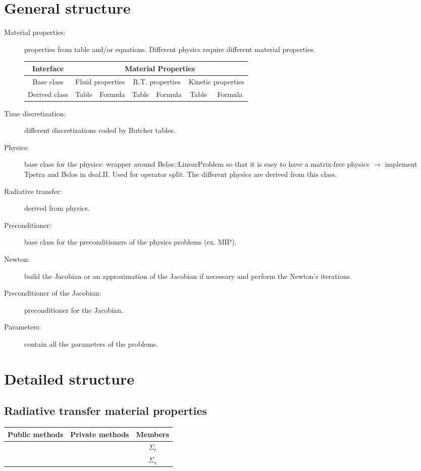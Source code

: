 \section{General structure}
\begin{description}
  \item[Material properties:] properties from table and/or equations.
    Different physics require different material properties.
    \begin{table}[H]
      \centering
      \begin{tabular}{|c|c|c|c|c|c|c|}
        \hline
        Interface & \multicolumn{6}{c|}{Material Properties} \\
        \hline
        Base class & \multicolumn{2}{c|}{Fluid properties} &
      \multicolumn{2}{c|}{R.T. properties} & \multicolumn{2}{c|}{Kinetic properties}
        \\
        \hline
        Derived class & Table & Formula & Table & Formula & Table & Formula \\
        \hline
      \end{tabular}
    \end{table}
  \item[Time discretization:] different discretizations coded by Butcher
    tables.
  \item[Physics:] base class for the physics: wrapper around
    Belos::LinearProblem so that it is easy to have a matrix-free physics
    $\rightarrow$ implement Tpetra and Belos in deal.II. Used for operator
    split. The different physics are derived from this class.
  \item[Radiative transfer:] derived from physics.
  \item[Preconditioner:] base class for the preconditioners of the physics
    problems (ex. MIP).
  \item[Newton:] build the Jacobian or an approximation of the Jacobian if
    necessary and perform the Newton's iterations.
  \item[Preconditioner of the Jacobian:] preconditioner for the Jacobian.
  \item[Parameters:] contain all the parameters of the problems.
\end{description}

\section{Detailed structure}
\subsection{Radiative transfer material properties}
\begin{table}[H]
  \centering
  \begin{tabular}{|c|c|c|}
    \hline
    Public methods & Private methods & Members \\
    \hline
                   &                 & $\Sigma_t$ \\
                   &                 & $\Sigma_s$ \\
    \hline
  \end{tabular}
\end{table}

